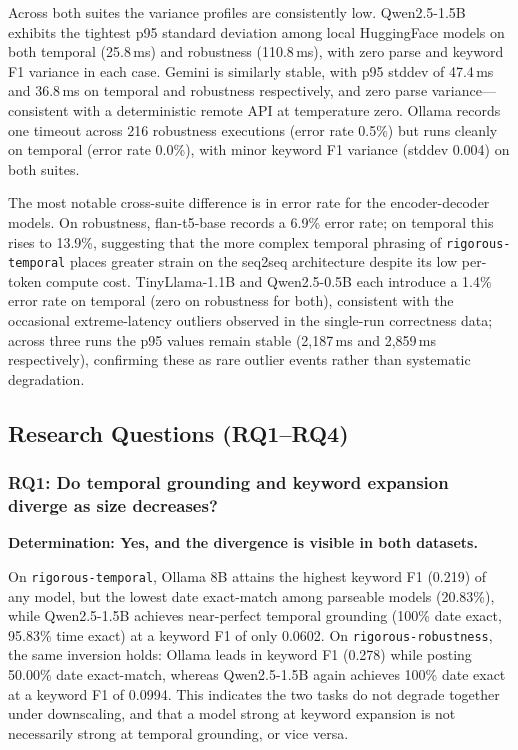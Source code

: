 \documentclass[conference]{IEEEtran}
\begin{document}
Across both suites the variance profiles are consistently low. Qwen2.5-1.5B exhibits the tightest p95 standard deviation among local HuggingFace models on both temporal (25.8\,ms) and robustness (110.8\,ms), with zero parse and keyword F1 variance in each case. Gemini is similarly stable, with p95 stddev of 47.4\,ms and 36.8\,ms on temporal and robustness respectively, and zero parse variance---consistent with a deterministic remote API at temperature zero. Ollama records one timeout across 216 robustness executions (error rate 0.5\%) but runs cleanly on temporal (error rate 0.0\%), with minor keyword F1 variance (stddev 0.004) on both suites.

The most notable cross-suite difference is in error rate for the encoder-decoder models. On robustness, flan-t5-base records a 6.9\% error rate; on temporal this rises to 13.9\%, suggesting that the more complex temporal phrasing of \texttt{rigorous-temporal} places greater strain on the seq2seq architecture despite its low per-token compute cost. TinyLlama-1.1B and Qwen2.5-0.5B each introduce a 1.4\% error rate on temporal (zero on robustness for both), consistent with the occasional extreme-latency outliers observed in the single-run correctness data; across three runs the p95 values remain stable (2,187\,ms and 2,859\,ms respectively), confirming these as rare outlier events rather than systematic degradation.

\subsection{Research Questions (RQ1--RQ4)}

\subsubsection{RQ1: Do temporal grounding and keyword expansion diverge as size decreases?}

\textbf{Determination: Yes, and the divergence is visible in both datasets.}

On \texttt{rigorous-temporal}, Ollama 8B attains the highest keyword F1 (0.219) of any model, but the lowest date exact-match among parseable models (20.83\%), while Qwen2.5-1.5B achieves near-perfect temporal grounding (100\% date exact, 95.83\% time exact) at a keyword F1 of only 0.0602. On \texttt{rigorous-robustness}, the same inversion holds: Ollama leads in keyword F1 (0.278) while posting 50.00\% date exact-match, whereas Qwen2.5-1.5B again achieves 100\% date exact at a keyword F1 of 0.0994. This indicates the two tasks do not degrade together under downscaling, and that a model strong at keyword expansion is not necessarily strong at temporal grounding, or vice versa.
\end{document}
